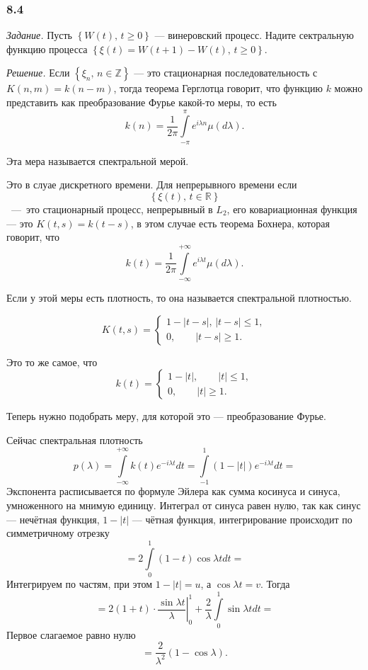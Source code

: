 \subsubsection*{8.4}

\textit{Задание.}
Пусть $ \left\{ W \left( t \right), \, t \geq 0 \right\} $ --- винеровский процесс.
Надите сектральную функцию процесса
$ \left\{
  \xi \left( t \right) = W \left( t + 1 \right) - W \left( t \right), \, t \geq 0 \right\} $.

\textit{Решение.}
Если $ \left\{ \xi_n, \, n \in \mathbb{Z} \right\} $ ---
это стационарная последовательность с $K \left( n, m \right) = k \left( n - m \right) $,
тогда теорема Герглотца говорит,
что функцию $k$ можно представить как преобразование Фурье какой-то меры, то есть
$$k \left( n \right) =
  \frac{1}{2 \pi } \int \limits_{-\pi }^{ \pi } e^{i \lambda n} \mu \left( d \lambda \right).$$

Эта мера называется спектральной мерой.

Это в слуае дискретного времени.
Для непрерывного времени если
$$ \left\{ \xi \left( t \right), \, t \in \mathbb{R} \right\} $$~---~это стационарный процесс,
непрерывный в $L_2$, его ковариационная функция ---
это $K \left( t, s \right) = k \left( t - s \right) $, в этом случае есть теорема Бохнера,
которая говорит, что
$$k \left( t \right) =
  \frac{1}{2 \pi }
  \int \limits_{-\infty }^{+\infty } e^{i \lambda t} \mu \left( d \lambda \right).$$

Если у этой меры есть плотность, то она называется спектральной плотностью.

$$K \left( t, s \right) =
  \begin{cases}
    1 - \left| t - s \right|, \, \left| t - s \right| \leq 1, \\
    0, \qquad \left| t - s \right| \geq 1.
  \end{cases}$$

Это то же самое, что
$$k \left( t \right) =
  \begin{cases}
    1 - \left| t \right|, \qquad \left| t \right| \leq 1, \\
    0, \qquad \left| t \right| \geq 1.
  \end{cases}$$

Теперь нужно подобрать меру, для которой это --- преобразование Фурье.

Сейчас спектральная плотность
$$p \left( \lambda \right) =
  \int \limits_{-\infty }^{+\infty } k \left( t \right) e^{-i \lambda t} dt =
  \int \limits_{-1}^1 \left( 1 - \left| t \right| \right) e^{-i \lambda t} dt =$$
Экспонента расписывается по формуле Эйлера как сумма косинуса и синуса,
умноженного на мнимую единицу.
Интеграл от синуса равен нулю, так как синус --- нечётная функция, $1 - \left| t \right| $ ---
чётная функция, интегрирование происходит по симметричному отрезку
$$= 2 \int \limits_0^1 \left( 1 - t \right) \cos \lambda t dt =$$
Интегрируем по частям, при этом $1 - \left| t \right| = u$, а $ \cos \lambda t = v$.
Тогда
$$= 2 \left. \left( 1 + t \right) \cdot \frac{ \sin \lambda t}{ \lambda } \right|_0^1 +
  \frac{2}{ \lambda } \int \limits_0^1 \sin \lambda t dt =$$
Первое слагаемое равно нулю
$$= \frac{2}{ \lambda^2} \left( 1 - \cos \lambda \right).$$

